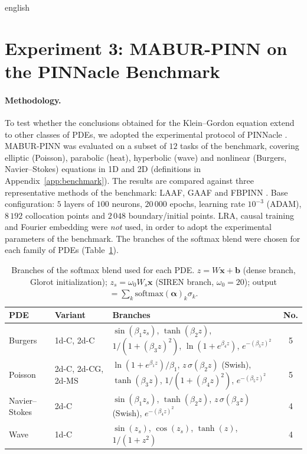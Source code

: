 \documentclass[0000.tex]{subfiles}
\begin{document}
\begin{hyphenrules}{english}
\section{Experiment 3: MABUR-PINN on the PINNacle Benchmark}\label{sec:exp-benchmark}

\paragraph{Methodology.}
To test whether the conclusions obtained for the Klein--Gordon equation extend to other classes of
PDEs, we adopted the experimental protocol of PINNacle \cite{hao2024pinnacle}. MABUR-PINN was evaluated
on a subset of $12$ tasks of the benchmark, covering elliptic (Poisson), parabolic (heat), hyperbolic
(wave) and nonlinear (Burgers, Navier--Stokes) equations in 1D and 2D (definitions in
Appendix~\ref{app:benchmark}). The results are compared against three representative methods of the benchmark:
LAAF, GAAF \cite{jagtap2020a,jagtap2020b} and FBPINN \cite{moseley2023}. Base configuration:
$5$ layers of $100$ neurons, $20\,000$ epochs, learning rate $10^{-3}$ (ADAM), $8\,192$ collocation points
and $2\,048$ boundary/initial points. LRA, causal training and Fourier embedding were \emph{not} used, in
order to adopt the experimental parameters of the benchmark. The branches of the softmax blend were chosen
for each family of PDEs (Table~\ref{tab:benchmark-activations}).

\begin{table}[htbp]
  \centering
  \caption[Branches of the softmax blend used for each PDE]{Branches of the softmax blend used for each PDE. $z=W\mathbf{x}+\mathbf{b}$ (dense branch, Glorot
  initialization); $z_s=\omega_0W_s\mathbf{x}$ (SIREN branch, $\omega_0=20$); output
  $=\sum_k\mathrm{softmax}(\bm\alpha)_k\sigma_k$.}
  \label{tab:benchmark-activations}
  \small
  \begin{tabularx}{\linewidth}{@{}llXc@{}}
    \toprule
    PDE & Variant & Branches & No. \\
    \midrule
    Burgers & 1d-C, 2d-C & $\sin(\beta_1z_s)$, $\tanh(\beta_2z)$, $1/(1+(\beta_3z)^2)$, $\ln(1+e^{\beta_4z})$, $e^{-(\beta_5z)^2}$ & 5 \\
    Poisson & 2d-C, 2d-CG, 2d-MS & $\ln(1+e^{\beta_1z})/\beta_1$, $z\,\sigma(\beta_2z)$ (Swish), $\tanh(\beta_3z)$, $1/(1+(\beta_4z)^2)$, $e^{-(\beta_5z)^2}$ & 5 \\
    Navier--Stokes & 2d-C & $\sin(\beta_1z_s)$, $\tanh(\beta_2z)$, $z\,\sigma(\beta_3z)$ (Swish), $e^{-(\beta_4z)^2}$ & 4 \\
    Wave & 1d-C & $\sin(z_s)$, $\cos(z_s)$, $\tanh(z)$, $1/(1+z^2)$ & 4 \\
    \bottomrule
  \end{tabularx}
\end{table}


\end{hyphenrules}
\end{document}
